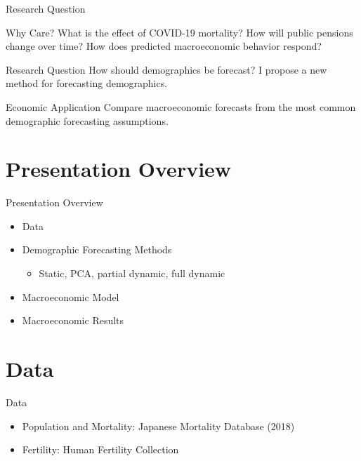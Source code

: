 \documentclass[12pt]{beamer}
\begin{document}
\begin{frame}{Research Question}

	\begin{block}{Why Care?}
		What is the effect of COVID-19 mortality? How will public pensions change over time? How does predicted macroeconomic behavior respond?
	\end{block}

	\begin{alertblock}{Research Question}
		How should demographics be forecast? I propose a new method for forecasting demographics.
	\end{alertblock}

	\begin{exampleblock}{Economic Application}
		Compare macroeconomic forecasts from the most common demographic forecasting assumptions.
	\end{exampleblock}

\end{frame}

\section{Presentation Overview}
\begin{frame}{Presentation Overview}

	\begin{itemize}
		\item Data
		\item Demographic Forecasting Methods
		\begin{itemize}
			\item Static, PCA, partial dynamic, full dynamic
		\end{itemize}
		\item Macroeconomic Model
		\item Macroeconomic Results
	\end{itemize}

\end{frame}

\section{Data}
\begin{frame}{Data}

	\begin{itemize}
		\item Population and Mortality: Japanese Mortality Database (2018)
		\item Fertility: Human Fertility Collection
	\end{itemize}

\end{frame}
\end{document}
